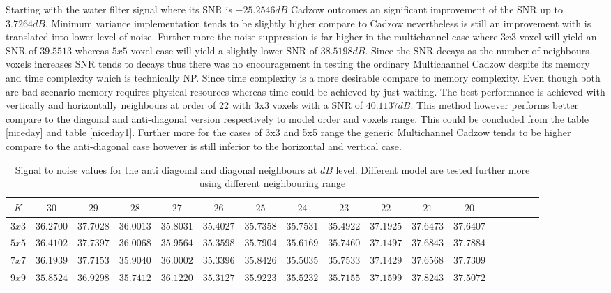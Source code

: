 Starting with the water filter signal where its SNR is \textbf{\textit{$-25.2546 dB$}} Cadzow outcomes an significant improvement of the SNR up to $3.7264 dB$. Minimum variance implementation tends to be slightly higher compare to Cadzow nevertheless is still an improvement with is translated into lower level of noise. Further more the noise suppression is far higher in the multichannel case where $3x3$ voxel will yield an SNR of $39.5513$ whereas $5x5$ voxel case will yield a slightly lower SNR of $38.5198 dB$. Since the SNR decays as the number of neighbours voxels increases SNR tends to decays thus there was no encouragement in testing the ordinary Multichannel Cadzow despite its memory and time complexity which is technically NP. Since time complexity is a more desirable  compare to memory complexity.  Even though both are bad scenario memory requires physical resources whereas time could be achieved by just waiting. 
The best performance is achieved with vertically and horizontally neighbours at order of 22 with 3x3 voxels with a SNR of \textbf{\textit{$40.1137 dB$}}. This method however performs better compare to the diagonal and anti-diagonal version   respectively to model order and voxels range. This could be concluded from the table \ref{niceday} and table \ref{niceday1}. Further more for the cases of 3x3 and 5x5 range the generic Multichannel Cadzow tends to be higher compare to the anti-diagonal case however is still inferior to the horizontal and vertical case.




\begin{table}[!htbp]
\centering
\caption{Signal to noise values for the anti diagonal and diagonal neighbours at $dB$ level. Different model are tested further more using different neighbouring range}\label{niceday}
\label{table:55}
\begin{tabular}{c c c c c c c c c c c c c c c c c}
  \hline  
$K$&$30$&$29$&$28$&$27$&$26$&$25$&$24$&$23$&$22$&$21$&$20$\\
  \hline  
$3x3$&$36.2700$&$37.7028$&$36.0013$&$35.8031$&$35.4027$&$35.7358$&$35.7531$&$35.4922$&$37.1925$&$37.6473$&$37.6407$\\
$5x5$&$36.4102$&$37.7397$&$36.0068$&$35.9564$&$35.3598$&$35.7904$&$35.6169$&$35.7460$&$37.1497$&$37.6843$&$37.7884$\\
$7x7$&$36.1939$&$37.7153$&$35.9040$&$36.0002$&$35.3396$&$35.8426$&$35.5035$&$35.7533$&$37.1429$&$37.6568$&$37.7309$\\
$9x9$&$35.8524$&$36.9298$&$35.7412$&$36.1220$&$35.3127$&$35.9223$&$35.5232$&$35.7155$&$37.1599$&$37.8243$&$37.5072$\\
  \hline  
\end{tabular}
\end{table}  
  

